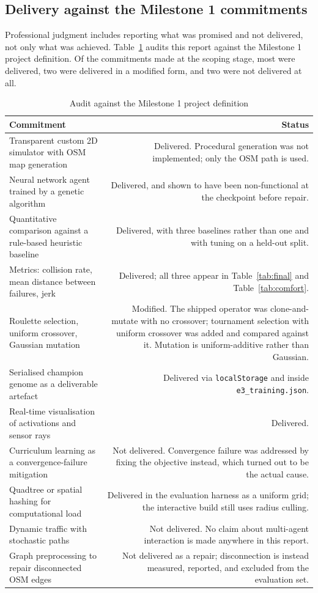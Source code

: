 \documentclass[conference]{IEEEtran}
\begin{document}
\subsection{Delivery against the Milestone 1 commitments}

Professional judgment includes reporting what was promised and not delivered, not only what was achieved. Table~\ref{tab:delivery} audits this report against the Milestone 1 project definition. Of the commitments made at the scoping stage, most were delivered, two were delivered in a modified form, and two were not delivered at all.

\begin{table}[!t]
\caption{Audit against the Milestone 1 project definition}
\label{tab:delivery}
\centering
\footnotesize
\begin{tabular}{lr}
\toprule
Commitment & Status \\
\midrule
Transparent custom 2D simulator with OSM map generation & Delivered. Procedural generation was not implemented; only the OSM path is used. \\
Neural network agent trained by a genetic algorithm & Delivered, and shown to have been non-functional at the checkpoint before repair. \\
Quantitative comparison against a rule-based heuristic baseline & Delivered, with three baselines rather than one and with tuning on a held-out split. \\
Metrics: collision rate, mean distance between failures, jerk & Delivered; all three appear in Table~\ref{tab:final} and Table~\ref{tab:comfort}. \\
Roulette selection, uniform crossover, Gaussian mutation & Modified. The shipped operator was clone-and-mutate with no crossover; tournament selection with uniform crossover was added and compared against it. Mutation is uniform-additive rather than Gaussian. \\
Serialised champion genome as a deliverable artefact & Delivered via \texttt{localStorage} and inside \texttt{e3\_training.json}. \\
Real-time visualisation of activations and sensor rays & Delivered. \\
Curriculum learning as a convergence-failure mitigation & Not delivered. Convergence failure was addressed by fixing the objective instead, which turned out to be the actual cause. \\
Quadtree or spatial hashing for computational load & Delivered in the evaluation harness as a uniform grid; the interactive build still uses radius culling. \\
Dynamic traffic with stochastic paths & Not delivered. No claim about multi-agent interaction is made anywhere in this report. \\
Graph preprocessing to repair disconnected OSM edges & Not delivered as a repair; disconnection is instead measured, reported, and excluded from the evaluation set. \\
\bottomrule
\end{tabular}
\end{table}
\end{document}
